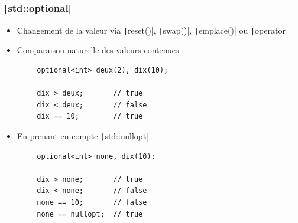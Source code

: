 \documentclass[C++.tex]{subfiles}
\begin{document}
\begin{frame}[fragile]
	\frametitle{\texttt|std::optional|}
	\begin{itemize}
		\item Changement de la valeur via \texttt|reset()|, \texttt|swap()|, \texttt|emplace()| ou \texttt|operator=|
		\item Comparaison naturelle des valeurs contenues 
	\end{itemize}

	\begin{verbatim}
		optional<int> deux(2), dix(10);

		dix > deux;       // true	
		dix < deux;       // false
		dix == 10;        // true
	\end{verbatim}

	\begin{itemize}
		\item En prenant en compte \texttt|std::nullopt|
	\end{itemize}

	\begin{verbatim}
		optional<int> none, dix(10);

		dix > none;       // true	
		dix < none;       // false
		none == 10;       // false
		none == nullopt;  // true
	\end{verbatim}

\end{frame}
\end{document}
